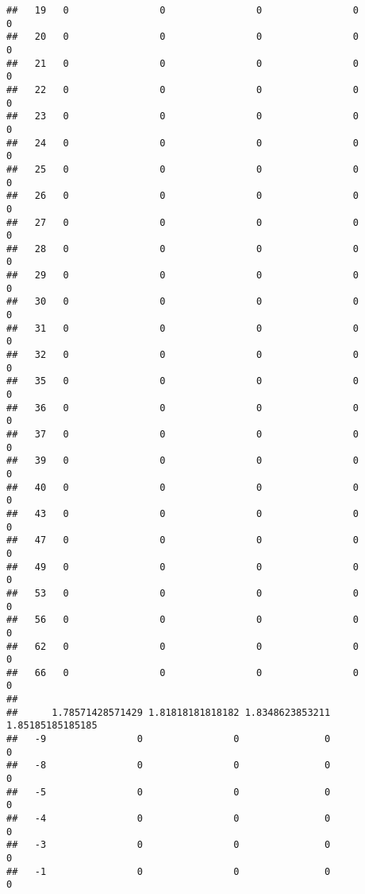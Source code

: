 \documentclass[]{article}
\begin{document}
\begin{verbatim}
##   19   0                0                0                0                0
##   20   0                0                0                0                0
##   21   0                0                0                0                0
##   22   0                0                0                0                0
##   23   0                0                0                0                0
##   24   0                0                0                0                0
##   25   0                0                0                0                0
##   26   0                0                0                0                0
##   27   0                0                0                0                0
##   28   0                0                0                0                0
##   29   0                0                0                0                0
##   30   0                0                0                0                0
##   31   0                0                0                0                0
##   32   0                0                0                0                0
##   35   0                0                0                0                0
##   36   0                0                0                0                0
##   37   0                0                0                0                0
##   39   0                0                0                0                0
##   40   0                0                0                0                0
##   43   0                0                0                0                0
##   47   0                0                0                0                0
##   49   0                0                0                0                0
##   53   0                0                0                0                0
##   56   0                0                0                0                0
##   62   0                0                0                0                0
##   66   0                0                0                0                0
##     
##      1.78571428571429 1.81818181818182 1.8348623853211 1.85185185185185
##   -9                0                0               0                0
##   -8                0                0               0                0
##   -5                0                0               0                0
##   -4                0                0               0                0
##   -3                0                0               0                0
##   -1                0                0               0                0

\end{verbatim}
\end{document}
